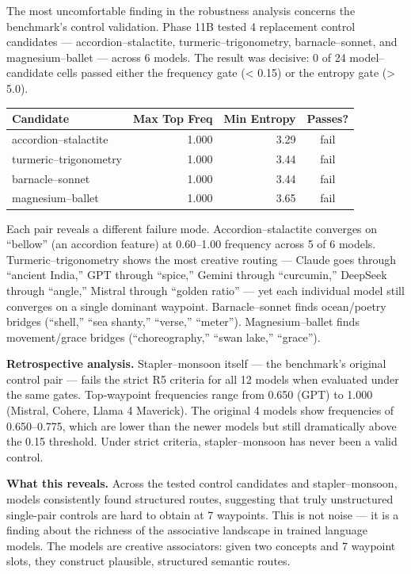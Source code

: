 The most uncomfortable finding in the robustness analysis concerns the benchmark's control validation. Phase 11B tested 4 replacement control candidates --- accordion--stalactite, turmeric--trigonometry, barnacle--sonnet, and magnesium--ballet --- across 6 models. The result was decisive: 0 of 24 model--candidate cells passed either the frequency gate (\textless{} 0.15) or the entropy gate (\textgreater{} 5.0).

\begin{longtable}[]{@{}lrrc@{}}
\toprule\noalign{}
Candidate & Max Top Freq & Min Entropy & Passes? \\
\midrule\noalign{}
\endhead
\bottomrule\noalign{}
\endlastfoot
accordion--stalactite & 1.000 & 3.29 & fail \\
turmeric--trigonometry & 1.000 & 3.44 & fail \\
barnacle--sonnet & 1.000 & 3.44 & fail \\
magnesium--ballet & 1.000 & 3.65 & fail \\
\end{longtable}

Each pair reveals a different failure mode. Accordion--stalactite converges on ``bellow'' (an accordion feature) at 0.60--1.00 frequency across 5 of 6 models. Turmeric--trigonometry shows the most creative routing --- Claude goes through ``ancient India,'' GPT through ``spice,'' Gemini through ``curcumin,'' DeepSeek through ``angle,'' Mistral through ``golden ratio'' --- yet each individual model still converges on a single dominant waypoint. Barnacle--sonnet finds ocean/poetry bridges (``shell,'' ``sea shanty,'' ``verse,'' ``meter''). Magnesium--ballet finds movement/grace bridges (``choreography,'' ``swan lake,'' ``grace'').

\textbf{Retrospective analysis.} Stapler--monsoon itself --- the benchmark's original control pair --- fails the strict R5 criteria for all 12 models when evaluated under the same gates. Top-waypoint frequencies range from 0.650 (GPT) to 1.000 (Mistral, Cohere, Llama 4 Maverick). The original 4 models show frequencies of 0.650--0.775, which are lower than the newer models but still dramatically above the 0.15 threshold. Under strict criteria, stapler--monsoon has never been a valid control.

\textbf{What this reveals.} Across the tested control candidates and stapler--monsoon, models consistently found structured routes, suggesting that truly unstructured single-pair controls are hard to obtain at 7 waypoints. This is not noise --- it is a finding about the richness of the associative landscape in trained language models. The models are creative associators: given two concepts and 7 waypoint slots, they construct plausible, structured semantic routes.

